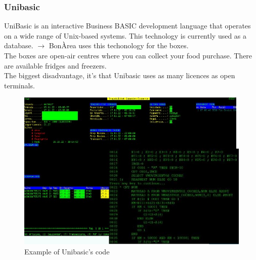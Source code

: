 \documentclass[12pt]{article}
\begin{document}
\subsubsection*{Unibasic}
UniBasic is an interactive Business BASIC development language that operates on a wide range of Unix-based systems.
This technology is currently used as a database. $\longrightarrow$ BonÀrea uses this techonology for the boxes.\\
The boxes are open-air centres where you can collect your food purchase. There are available fridges and freezers.\\
The biggest disadvantage, it's that Unibasic uses as many licences as open terminals. 
\begin{figure}[H]
    \centering
    \includegraphics[scale = 0.7]{Images/unibasic.jpg}
    \caption{Example of Unibasic's code}
    \label{fig:unibasic}
\end{figure}
\end{document}

